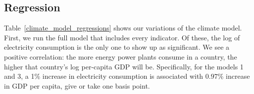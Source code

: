 \documentclass[11pt]{article}
\begin{document}
\subsection{Regression}
Table~\ref{climate_model_regressions} shows our variations of the climate model.
First, we run the full model that includes every indicator.
Of these, the log of electricity consumption is the only one to show up as significant.
We see a positive correlation: the more energy power plants consume in a country, the higher that country's log per-capita GDP will be.
Specifically, for the models 1 and 3, a 1\% increase in electricity consumption is associated with $0.97$\% increase in GDP per capita, give or take one basis point.

\end{document}
